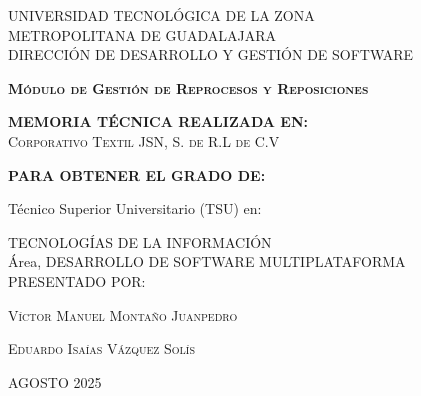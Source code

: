 \documentclass[12pt,letterpaper,spanish]{report}
\begin{document}
\thispagestyle{empty}


\begin{center}

 \begin{minipage}[b]{.9\linewidth}
    \begin{center}
        \vspace{0.2in}
        \large{UNIVERSIDAD TECNOLÓGICA DE LA ZONA \\METROPOLITANA DE GUADALAJARA}\\
        \large{DIRECCIÓN DE DESARROLLO Y GESTIÓN DE SOFTWARE}\\
    \end{center}
\end{minipage}
\vspace{0.3in}


\centerline{\hbox{}}

\LARGE{\textbf{\textsc{Módulo de Gestión de Reprocesos y Reposiciones}} }

\vspace{0.2in}
\large{\textbf{MEMORIA TÉCNICA REALIZADA EN:}}
 \\  \textsc{Corporativo Textil JSN, S. de R.L de C.V}

\vspace{0.2in}
\large{\textbf{PARA OBTENER EL GRADO DE:}}

\large{Técnico Superior Universitario (TSU) en:}


\large{TECNOLOGÍAS DE LA INFORMACIÓN\\Área, DESARROLLO DE SOFTWARE MULTIPLATAFORMA }
\\

\vspace{0.2in}
\large{PRESENTADO POR:}


\textsc{Víctor Manuel Montaño Juanpedro}  %


\textsc{Eduardo Isaías Vázquez Solís}  %

\vspace{0.2in}
\small{ AGOSTO 2025}
\end{center}


\newpage



\end{document}
